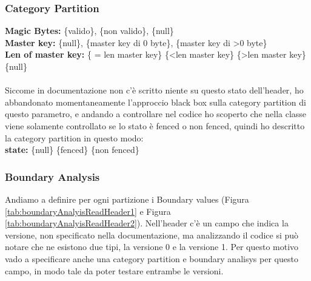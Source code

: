 \documentclass[12pt, a4paper]{article}
\begin{document}
\subsubsection{Category Partition}
\textbf{Magic Bytes:} \{valido\}, \{non valido\}, \{null\} \\
\textbf{Master key:} \{null\}, \{master key di 0 byte\}, \{master key di \textgreater 0 byte\} \\
\textbf{Len of master key:} \{ = len master key\} \{\textless len master key\} \{\textgreater len master key\} \{null\} \\ \\
Siccome in documentazione non c'è scritto niente su questo stato dell'header, ho abbandonato momentaneamente
l'approccio black box sulla category partition di questo parametro, e andando a controllare nel codice
ho scoperto che nella classe viene solamente controllato se lo stato è fenced o non fenced, quindi ho descritto 
la category partition in questo modo: \\
\textbf{state:} \{null\} \{fenced\} \{non fenced\} \\


\subsubsection{Boundary Analysis}
Andiamo a definire per ogni partizione i Boundary values (Figura \ref{tab:boundaryAnalyisReadHeader1} e Figura \ref{tab:boundaryAnalyisReadHeader2}). 
Nell'header c'è un campo che indica la versione, non specificato nella documentazione, ma
analizzando il codice si può notare che ne esistono due tipi, la versione 0 e la versione 1. Per questo motivo
vado a specificare anche una category partition e boundary analisys per questo campo, in modo tale da poter testare entrambe le versioni. \\
\end{document}
